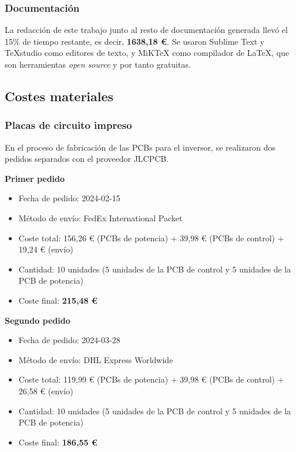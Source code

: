 \subsubsection{Documentación}
La redacción de este trabajo junto al resto de documentación generada llevó el 15\% de tiempo restante, es decir, \textbf{1638,18 \euro{}}. Se usaron Sublime Text y TeXstudio como editores de texto, y MiKTeX como compilador de \LaTeX, que son herramientas \textit{open source} y por tanto gratuitas.

\subsection{Costes materiales}

\subsubsection{Placas de circuito impreso}

En el proceso de fabricación de las PCBs para el inversor, se realizaron dos pedidos separados con el proveedor JLCPCB.

\textbf{Primer pedido}
\begin{itemize}
	\item Fecha de pedido: 2024-02-15
	\item Método de envío: FedEx International Packet
	\item Coste total: 156,26 \euro{} (PCBs de potencia) + 39,98 \euro{} (PCBs de control) + 19,24 \euro{} (envío)
	\item Cantidad: 10 unidades (5 unidades de la PCB de control y 5 unidades de la PCB de potencia)
	\item Coste final: \textbf{215,48 \euro{}}

\end{itemize}

\hspace{1cm}

\textbf{Segundo pedido}
\begin{itemize}
	\item Fecha de pedido: 2024-03-28
	\item Método de envío: DHL Express Worldwide
	\item Coste total: 119,99 \euro{} (PCBs de potencia) + 39,98 \euro{} (PCBs de control) + 26,58 \euro{} (envío)
	\item Cantidad: 10 unidades (5 unidades de la PCB de control y 5 unidades de la PCB de potencia)
	\item Coste final: \textbf{186,55 \euro{}}
\end{itemize}

